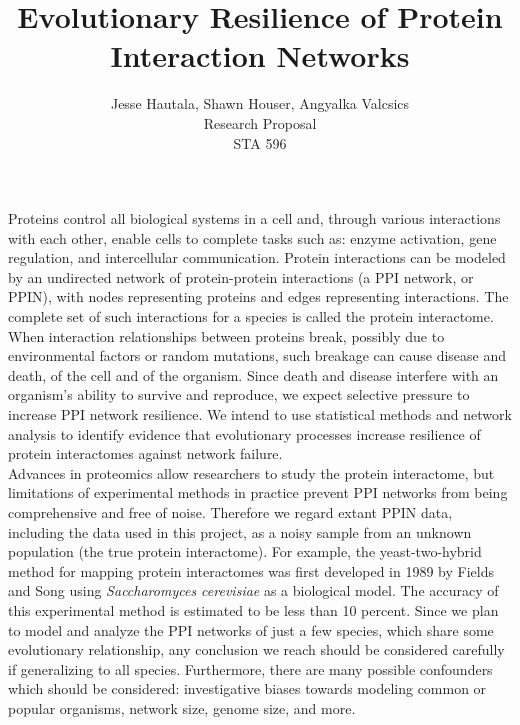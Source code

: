 \documentclass[12pt]{article}
\begin{document}
\title{\textbf{Evolutionary Resilience of Protein Interaction Networks}}
\author{Jesse Hautala, Shawn Houser, Angyalka Valcsics \\ Research Proposal \\ STA 596}

	\maketitle
\doublespacing

\indent Proteins control all biological systems in a cell and, through various interactions with each other, enable cells to complete tasks such as: enzyme activation, gene regulation, and intercellular communication. Protein interactions can be modeled by an undirected network of protein-protein interactions (a PPI network, or PPIN), with nodes representing proteins and edges representing interactions. The complete set of such interactions for a species is called the protein interactome. When interaction relationships between proteins break, possibly due to environmental factors or random mutations, such breakage can cause disease and death, of the cell and of the organism. Since death and disease interfere with an organism's ability to survive and reproduce, we expect selective pressure to increase PPI network resilience. We intend to use statistical methods and network analysis to identify evidence that evolutionary processes increase resilience of protein interactomes against network failure. \\
\indent Advances in proteomics allow researchers to study the protein interactome, but limitations of experimental methods in practice prevent PPI networks from being comprehensive and free of noise. Therefore we regard extant PPIN data, including the data used in this project, as a noisy sample from an unknown population (the true protein interactome). For example, the yeast-two-hybrid method for mapping protein interactomes was first developed in 1989 by Fields and Song using \textit{Saccharomyces cerevisiae} as a biological model. The accuracy of this experimental method is estimated to be less than 10 percent. Since we plan to model and analyze the PPI networks of just a few species, which share some evolutionary relationship, any conclusion we reach should be considered carefully if generalizing to all species. Furthermore, there are many possible confounders which should be considered: investigative biases towards modeling common or popular organisms, network size, genome size, and more.   \\
\end{document}
